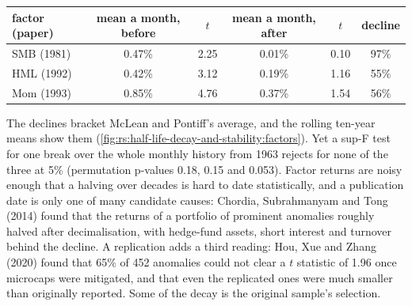 \begin{center}
\small
\begin{tabular}{@{}lccccc@{}}
\toprule
factor (paper) & mean a month, before & $t$ & mean a month, after & $t$ & decline\\
\midrule
SMB (1981) & 0.47\% & 2.25 & 0.01\% & 0.10 & 97\%\\
HML (1992) & 0.42\% & 3.12 & 0.19\% & 1.16 & 55\%\\
Mom (1993) & 0.85\% & 4.76 & 0.37\% & 1.54 & 56\%\\
\bottomrule
\end{tabular}
\end{center}

The declines bracket McLean and Pontiff's average, and the rolling ten-year means show them
(\cref{fig:rs:half-life-decay-and-stability:factors}). Yet a sup-F test for one break over the whole monthly history from 1963 rejects for
none of the three at 5\% (permutation p-values 0.18, 0.15 and 0.053). Factor returns are noisy enough that a halving over decades is hard
to date statistically, and a publication date is only one of many candidate causes: Chordia, Subrahmanyam and Tong (2014) found that the
returns of a portfolio of prominent anomalies roughly halved after decimalisation, with hedge-fund assets, short interest and turnover
behind the decline. A replication adds a third reading: Hou, Xue and Zhang (2020) found that 65\% of 452 anomalies could not clear a $t$
statistic of 1.96 once microcaps were mitigated, and that even the replicated ones were much smaller than originally reported. Some of the
decay is the original sample's selection.

